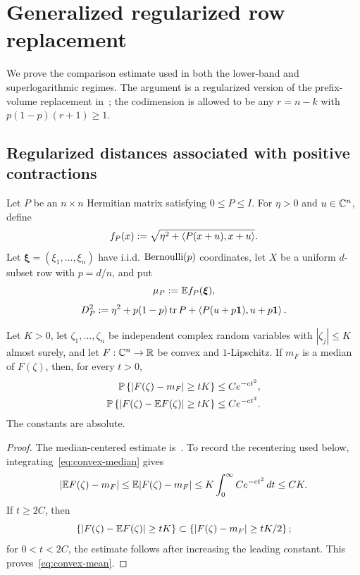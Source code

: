\section{Generalized regularized row replacement}\label{sec:replacement}

We prove the comparison estimate used in both the lower-band and superlogarithmic regimes. The argument is a regularized version of the prefix-volume replacement in~\cite[Section~3]{LLY26a}; the codimension is allowed to be any $r=n-k$ with $p(1-p)(r+1)\ge1$.

\subsection{Regularized distances associated with positive contractions}

Let $P$ be an $n\times n$ Hermitian matrix satisfying $0\le P\le I$. For $\eta>0$ and $u\in\mathbb C^n$, define
\[
  f_P(x):=\sqrt{\eta^2+\left\langle P(x+u),x+u\right\rangle}.
\]
Let $\boldsymbol\xi=(\xi_1,\ldots,\xi_n)$ have i.i.d. $\operatorname{Bernoulli}(p)$ coordinates, let $X$ be a uniform $d$-subset row with $p=d/n$, and put
\[
  \mu_P:=\mathbb E f_P(\boldsymbol\xi),
\]
\begin{equation}\label{eq:DP}
  D_P^2:=\eta^2+p(1-p)\operatorname{tr} P
  +\left\langle P(u+p\mathbf 1),u+p\mathbf 1\right\rangle.
\end{equation}

\begin{lemma}\label{lem:convex-concentration}
Let $K>0$, let $\zeta_1,\ldots,\zeta_n$ be independent complex random variables with $|\zeta_j|\le K$ almost surely, and let $F:\mathbb C^n\to\mathbb R$ be convex and $1$-Lipschitz. If $m_F$ is a median of $F(\zeta)$, then, for every $t>0$,
\begin{align}
  \mathbb P\left\{|F(\zeta)-m_F|\ge tK\right\}&\le Ce^{-ct^2},
  \label{eq:convex-median}\\
  \mathbb P\left\{|F(\zeta)-\mathbb E F(\zeta)|\ge tK\right\}&\le Ce^{-ct^2}.
  \label{eq:convex-mean}
\end{align}
The constants are absolute.
\end{lemma}

\begin{proof}
The median-centered estimate is~\cite[Theorem~2.1.13]{Tao12}. To record the recentering used below, integrating~\eqref{eq:convex-median} gives
\[
  |\mathbb E F(\zeta)-m_F|
  \le\mathbb E|F(\zeta)-m_F|
  \le K\int_0^\infty Ce^{-ct^2}\,d t
  \le CK.
\]
If $t\ge2C$, then
\[
  \left\{|F(\zeta)-\mathbb E F(\zeta)|\ge tK\right\}
  \subset
  \left\{|F(\zeta)-m_F|\ge tK/2\right\};
\]
for $0<t<2C$, the estimate follows after increasing the leading constant. This proves~\eqref{eq:convex-mean}.
\end{proof}

